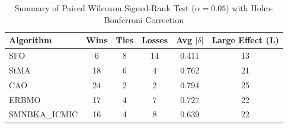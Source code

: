 \begin{table}[!t]
\centering\small
\caption{Summary of Paired Wilcoxon Signed-Rank Test ($\alpha=0.05$) with Holm-Bonferroni Correction}
\label{tab:summary_stats}
\begin{tabular}{l|c|c|c|c|c}
\hline
Algorithm & Wins & Ties & Losses & Avg $|\delta|$ & Large Effect (L) \\\hline\hline
SFO & 6 & 8 & 14 & 0.411 & 13 \\\hline
StMA & 18 & 6 & 4 & 0.762 & 21 \\\hline
CAO & 24 & 2 & 2 & 0.794 & 25 \\\hline
ERBMO & 17 & 4 & 7 & 0.727 & 22 \\\hline
SMNBKA_ICMIC & 16 & 4 & 8 & 0.639 & 22 \\\hline
\end{tabular}
\end{table}
